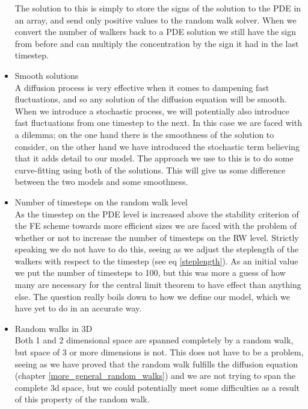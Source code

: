 \begin{itemize}
 The solution to this is simply to store the signs of the solution to the PDE in an array, and send only positive values to the random walk solver. 
 When we convert the number of walkers back to a PDE solution we still have the sign from before and can multiply the concentration by the sign it had in the last timestep. 
 \item Smooth solutions\\
 A diffusion process is very effective when it comes to dampening fast fluctuations, and so any solution of the diffusion equation will be smooth. 
 When we introduce a stochastic process, we will potentially also introduce fast fluctuations from one timestep to the next. 
 In this case we are faced with a dilemma; on the one hand there is the smoothness of the solution to consider, on the other hand we have introduced the stochastic term believing that it adds detail to our model. 
 The approach we use to this is to do some curve-fitting using both of the solutions. 
 This will give us some difference between the two models and some smoothness.
 \item Number of timesteps on the random walk level\\
 As the timestep on the PDE level is increased above the stability criterion of the FE scheme towards more efficient sizes we are faced with the problem of whether or not to increase the number of timesteps on the RW level. 
 Strictly speaking we do not have to do this, seeing as we adjust the steplength of the walkers with respect to the timestep (see eq \ref{steplength}). 
 As an initial value we put the number of timesteps to 100, but this was more a guess of how many are necessary for the central limit theorem to have effect than anything else. 
 The question really boils down to how we define our model, which we have yet to do in an accurate way.
 \item Random walks in 3D\\
 Both 1 and 2 dimensional space are spanned completely by a random walk, but space of 3 or more dimensions is not. 
 This does not have to be a problem, seeing as we have proved that the random walk fulfills the diffusion equation (chapter \ref{more_general_random_walks}) and we are not trying to span the complete 3d space, but we could potentially meet some difficulties as a result of this property of the random walk.
\end{itemize}

